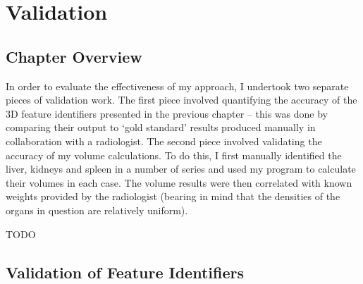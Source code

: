 \chapter{Validation}
\label{chap:validation}

\section{Chapter Overview}


In order to evaluate the effectiveness of my approach, I undertook two separate pieces of validation work. The first piece involved quantifying the accuracy of the 3D feature identifiers presented in the previous chapter -- this was done by comparing their output to `gold standard' results produced manually in collaboration with a radiologist. The second piece involved validating the accuracy of my volume calculations. To do this, I first manually identified the liver, kidneys and spleen in a number of series and used my program to calculate their volumes in each case. The volume results were then correlated with known weights provided by the radiologist (bearing in mind that the densities of the organs in question are relatively uniform).

TODO

\section{Validation of Feature Identifiers}

